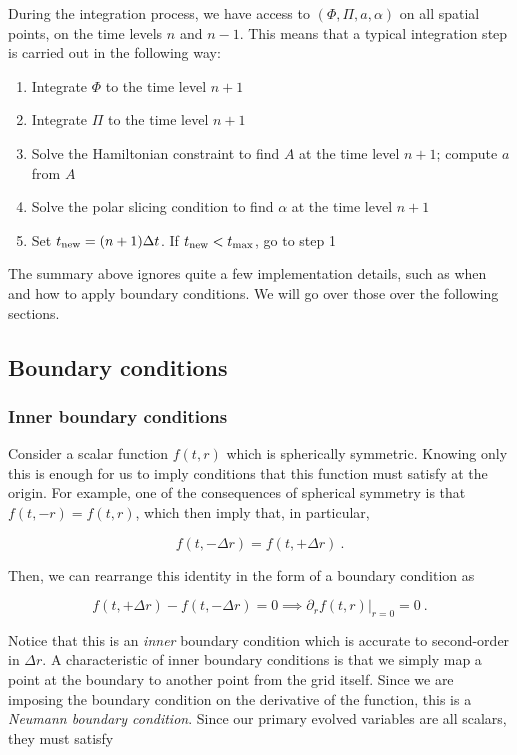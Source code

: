 \documentclass[a4paper,11pt]{article}
\renewcommand{\a}{\alpha}
\newcommand{\pd}{\partial}
\newcommand{\dt}{\Delta t}
\newcommand{\dr}{\Delta r}
\newcommand{\lrpar}[1]{\left( #1 \right)}
\newcommand{\n}{\noindent}
\newcommand{\eq}[1]{
  \begin{equation}
    #1
  \end{equation}
}
\begin{document}
During the integration process, we have access to $\lrpar{\Phi,\Pi,a,\a}$ on all spatial points, on the time levels $n$ and $n-1$. This means that a typical integration step is carried out in the following way:

\begin{enumerate}
\item Integrate $\Phi$ to the time level $n+1$
\item Integrate $\Pi$ to the time level $n+1$
\item Solve the Hamiltonian constraint to find $A$ at the time level $n+1$; compute $a$ from $A$
\item Solve the polar slicing condition to find $\a$ at the time level $n+1$
\item Set $t_{\rm new} = (n+1)\dt$. If $t_{\rm new}<t_{\max}$, go to step 1
\end{enumerate}

The summary above ignores quite a few implementation details, such as when and how to apply boundary conditions. We will go over those over the following sections.

\subsection{Boundary conditions}

\subsubsection{Inner boundary conditions}

Consider a scalar function $f(t,r)$ which is spherically symmetric. Knowing only this is enough for us to imply conditions that this function must satisfy at the origin. For example, one of the consequences of spherical symmetry is that $f\lrpar{t,-r}=f\lrpar{t,r}$, which then imply that, in particular,

\eq{ f\lrpar{t,-\dr} = f\lrpar{t,+\dr}\ . }

\n Then, we can rearrange this identity in the form of a boundary condition as

\eq{ f\lrpar{t,+\dr} - f\lrpar{t,-\dr} = 0 \implies \left.\pd_{r}f(t,r)\right|_{r=0} = 0\ . }

\n Notice that this is an \emph{inner} boundary condition which is accurate to second-order in $\dr$. A characteristic of inner boundary conditions is that we simply map a point at the boundary to another point from the grid itself. Since we are imposing the boundary condition on the derivative of the function, this is a \emph{Neumann boundary condition}. Since our primary evolved variables are all scalars, they must satisfy
\end{document}
